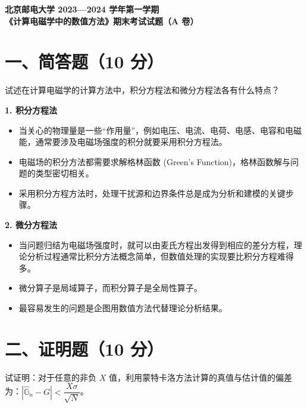 \documentclass[11pt, a4paper]{article}
\begin{document}
\begin{center}
    \LARGE \bfseries 北京邮电大学 2023—2024 学年第一学期 \\
    《计算电磁学中的数值方法》期末考试试题（A 卷）
\end{center}

\vspace{1em}

\section*{一、简答题（10 分）}
试述在计算电磁学的计算方法中，积分方程法和微分方程法各有什么特点？

\begin{tcolorbox}[colback=white, colframe=black, title=【解答】（第一章56页）]
\textbf{1. 积分方程法}
\begin{itemize}
    \item 当关心的物理量是一些“作用量”，例如电压、电流、电荷、电感、电容和电磁能，通常要涉及电磁场强度的积分就要采用积分方程法。
    \item 电磁场的积分方法都需要求解格林函数 (Green's Function)，格林函数解与问题的类型密切相关。
    \item 采用积分方程方法时，处理干扰源和边界条件总是成为分析和建模的关键步骤。
\end{itemize}

\textbf{2. 微分方程法}
\begin{itemize}
    \item 当问题归结为电磁场强度时，就可以由麦氏方程出发得到相应的差分方程，理论分析过程通常比积分方法概念简单，但数值处理的实现要比积分方程难得多。
    \item 微分算子是局域算子，而积分算子是全局性算子。
    \item 最容易发生的问题是企图用数值方法代替理论分析结果。
\end{itemize}
\end{tcolorbox}

\section*{二、证明题（10 分）}
试证明：对于任意的非负 $X$ 值，利用蒙特卡洛方法计算的真值与估计值的偏差为：$\left| \widehat{\mathbb{G}}_n - G \right| < \dfrac{X\sigma}{\sqrt{N}}$。
\end{document}

